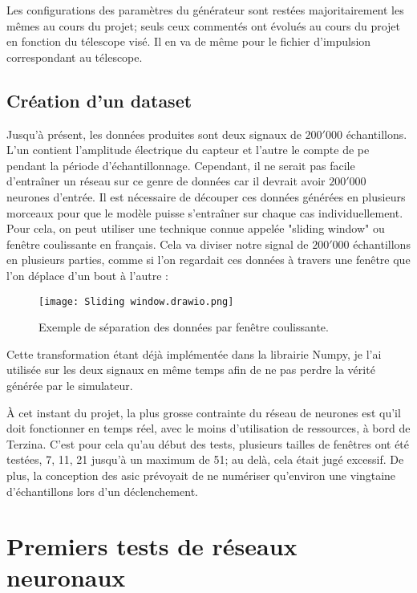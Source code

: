 Les configurations des paramètres du générateur sont restées majoritairement les mêmes au cours du projet;
seuls ceux commentés ont évolués au cours du projet en fonction du télescope visé. Il en va de même pour le fichier
d'impulsion correspondant au télescope.

\newpage
\subsection{Création d'un dataset}
Jusqu'à présent, les données produites sont deux signaux de $200'000$ échantillons. L'un contient l'amplitude électrique du capteur
et l'autre le compte de \gls{pe} pendant la période d'échantillonnage. Cependant, il ne serait pas facile d'entraîner un réseau
sur ce genre de données car il devrait avoir $200'000$ neurones d'entrée. Il est nécessaire de découper ces données
générées en plusieurs morceaux pour que le modèle puisse s'entraîner sur chaque cas individuellement.
Pour cela, on peut utiliser une technique connue appelée "sliding window" ou fenêtre coulissante en français.
Cela va diviser notre signal de $200'000$ échantillons en plusieurs parties, comme si l'on regardait ces données 
à travers une fenêtre que l'on déplace d'un bout à l'autre :

\begin{figure}[tbph!]
	\centering
	\texttt{[image: Sliding window.drawio.png]}
	\caption[Exemple de séparation des données par fenêtre coulissante]{Exemple de séparation des données par fenêtre coulissante.}
\end{figure}

Cette transformation étant déjà implémentée dans la librairie Numpy, je l'ai utilisée sur les deux signaux 
en même temps afin de ne pas perdre la vérité générée par le simulateur.

À cet instant du projet, la plus grosse contrainte du réseau de neurones est qu'il doit 
fonctionner en temps réel, avec le moins d'utilisation de ressources, à bord de Terzina.
C'est pour cela qu'au début des tests, plusieurs tailles de fenêtres ont été testées, 7, 11, 21 
jusqu'à un maximum de 51; au delà, cela était jugé excessif.
De plus, la conception des \gls{asic} prévoyait de ne numériser qu'environ une vingtaine d'échantillons lors d'un déclenchement.

\section{Premiers tests de réseaux neuronaux}

